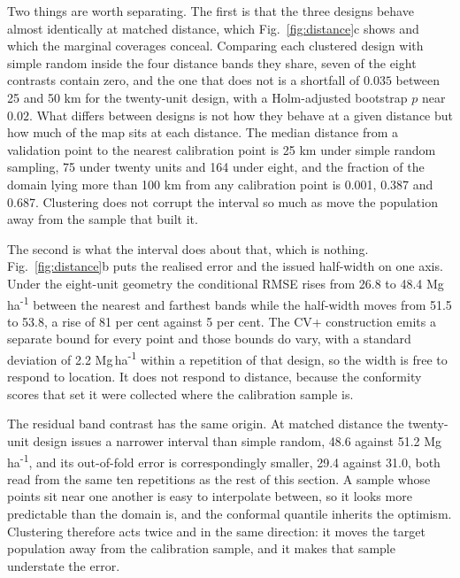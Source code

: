 \documentclass[preprint,12pt,authoryear]{elsarticle}
\newcommand{\Mgha}{Mg\,ha\textsuperscript{-1}}
\begin{document}
Two things are worth separating. The first is that the three designs behave
almost identically at matched distance, which Fig.~\ref{fig:distance}c shows and
which the marginal coverages conceal. Comparing each clustered design with
simple random inside the four distance bands they share, seven of the eight
contrasts contain zero, and the one that does not is a shortfall of $0.035$
between 25 and 50 km for the twenty-unit design, with a Holm-adjusted
bootstrap $p$ near $0.02$. What differs between designs is not how they behave at a given
distance but how much of the map sits at each distance. The median distance from
a validation point to the nearest calibration point is 25 km under
simple random sampling, 75 under twenty units and 164 under eight, and the
fraction of the domain lying more than 100 km from any calibration
point is 0.001, 0.387 and 0.687. Clustering does not corrupt the interval so
much as move the population away from the sample that built it.

The second is what the interval does about that, which is nothing.
Fig.~\ref{fig:distance}b puts the realised error and the issued half-width on
one axis. Under the eight-unit geometry the conditional RMSE rises from 26.8 to
48.4 \Mgha{} between the nearest and farthest bands while the half-width moves
from 51.5 to 53.8, a rise of 81 per cent against 5 per cent. The CV+ construction
emits a separate bound for every point and those bounds do vary, with a standard
deviation of 2.2 \Mgha{} within a repetition of that design, so the width is
free to respond to location. It does not respond to distance, because the conformity scores that
set it were collected where the calibration sample is.

The residual band contrast has the same origin. At matched distance the
twenty-unit design issues a narrower interval than simple random, 48.6 against
51.2 \Mgha{}, and its out-of-fold error is correspondingly smaller, 29.4 against
31.0, both read from the same ten repetitions as the rest of this section. A sample whose points sit near one another is easy to interpolate between,
so it looks more predictable than the domain is, and the conformal quantile
inherits the optimism. Clustering therefore acts twice and in the same
direction: it moves the target population away from the calibration sample, and
it makes that sample understate the error.
\end{document}
